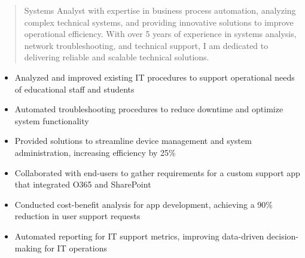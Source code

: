



\makecvheader

\begin{quote}
  \noindent
  Systems Analyst with expertise in business process automation, analyzing complex technical systems, and providing innovative solutions to improve operational efficiency. With over 5 years of experience in systems analysis, network troubleshooting, and technical support, I am dedicated to delivering reliable and scalable technical solutions.
\end{quote}

\par\smallskip
\noindent
\begin{minipage}{20cm}
  \begin{minipage}{9.75cm}
    \begin{itemize}
      \item Analyzed and improved existing IT procedures to support operational needs of educational staff and students
      \item Automated troubleshooting procedures to reduce downtime and optimize system functionality
      \item Provided solutions to streamline device management and system administration, increasing efficiency by 25\%
    \end{itemize}
  \end{minipage}
  \hfill
  \begin{minipage}{9.75cm}
    \begin{itemize}
      \item Collaborated with end-users to gather requirements for a custom support app that integrated O365 and SharePoint
      \item Conducted cost-benefit analysis for app development, achieving a 90\% reduction in user support requests
      \item Automated reporting for IT support metrics, improving data-driven decision-making for IT operations
    \end{itemize}
  \end{minipage}
\end{minipage}
\par\smallskip
\divider

